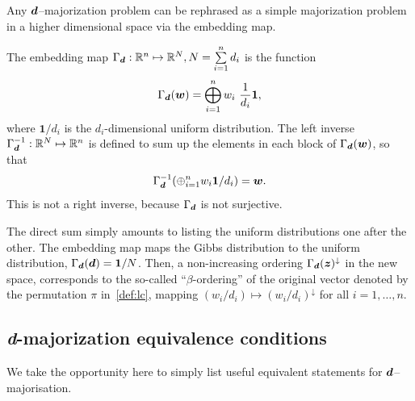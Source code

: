 Any $\bm{d}$--majorization problem can be rephrased as a simple majorization problem in a higher dimensional space via the embedding map.
\begin{definition}
  The embedding map $\Gamma_{\bm{d}}:\mathbb{R}^n \mapsto \mathbb{R}^N, N = \sum\limits_{i=1}^n d_i$ is the function
  \begin{equation}
    \Gamma_{\bm{d}}(\bm{w}) = \bigoplus_{i=1}^n w_i\  \frac{1}{d_i}\bm{1},
  \end{equation}
where $\bm{1}/d_i$ is the $d_i$-dimensional uniform distribution.
The left inverse $\Gamma_{\bm{d}}^{-1}: \mathbb{R}^N \mapsto \mathbb{R}^n$ is defined to sum up the elements in each block of $\Gamma_{\bm{d}}(\bm{w})$, so that
  \begin{equation}
     \Gamma_{\bm{d}}^{-1}(\oplus_{i=1}^n w_i \bm{1}/d_i) = \bm{w}.
  \end{equation}
  This is not a right inverse, because $\Gamma_{\bm{d}}$ is not surjective.
\end{definition}
The direct sum simply amounts to listing the uniform distributions one after the other.
The embedding map maps the Gibbs distribution to the uniform distribution, $\Gamma_{\bm{d}}(\bm{d}) = \bm{1}/N$.
Then, a non-increasing ordering $\Gamma_{\bm{d}}(\bm{z})^\downarrow$ in the new space, corresponds to the so-called ``$\beta$-ordering'' of the original vector denoted by the permutation $\pi$ in~\cref{def:lc}, mapping $(w_i/d_i) \mapsto (w_i/d_i)^\downarrow$ for all $i=1,\dots,n$.

\subsection{\textit{d}-majorization equivalence conditions}

We take the opportunity here	 to simply list useful equivalent statements for $\bm{d}$--majorisation.

